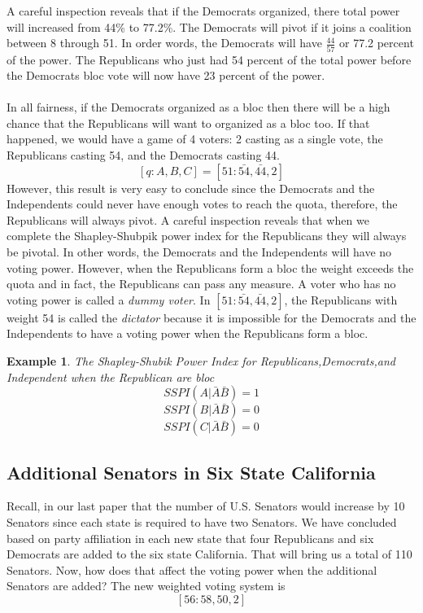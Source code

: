 \documentclass[12pt]{article}
\newtheorem{example}[theorem]{Example}
\begin{document}
\noindent A careful inspection reveals that if the Democrats organized, there total power will increased from 44\% to 77.2\%. The Democrats will pivot if it joins a coalition between 8 through 51. In order words, the Democrats will have $\frac{44}{57}$ or 77.2 percent of the power. The Republicans who just had 54 percent of the total power before the Democrats bloc vote will now have 23 percent of the power.
\\
\\
In all fairness, if the Democrats organized as a bloc then there will be a high chance that the Republicans will want to organized as a bloc too. If that happened, we would have a game of 4 voters: 2 casting as a single vote, the Republicans casting 54, and the Democrats casting 44.
$$[q:A,B,C]=[51: \bar{54},\bar{44},2]$$
However, this result is very easy to conclude since the Democrats and the Independents could never have enough votes to reach the quota, therefore, the Republicans will always pivot. A careful inspection reveals that when we complete the Shapley-Shubpik power index for the Republicans they will always be pivotal. In other words, the Democrats and the Independents will have no voting power. However, when the Republicans form a bloc the weight exceeds the quota and in fact, the Republicans can pass any measure.  A voter who has no voting power is called a \textit{dummy voter}. In $[51: \bar{54},\bar{44},2]$, the Republicans with weight 54 is called the \textit{dictator} because it is impossible for the Democrats and the Independents  to have a voting power when the Republicans form a bloc. 
\begin{example}\label{example3}
The Shapley-Shubik Power Index for Republicans,Democrats,and Independent when the Republican are bloc
\begin{equation}
SSPI(A|\bar{A}\bar{B}) = 1
\end{equation}
\begin{equation}
SSPI(B|\bar{A}\bar{B}) = 0
\end{equation}
\begin{equation}
SSPI(C|\bar{A}\bar{B}) = 0
\end{equation}
\end{example}



\subsection{Additional Senators in Six State California}
Recall, in our last paper that the number of U.S. Senators would increase by 10 Senators since each state is required to have two Senators.\cite{T} We have concluded based on party affiliation in each new state that four Republicans and six Democrats are added to the six state California. That will bring us a total of 110 Senators. Now, how does that affect the voting power when the additional Senators are added? The new weighted voting system is $$[56:58,50,2]$$
\end{document}
